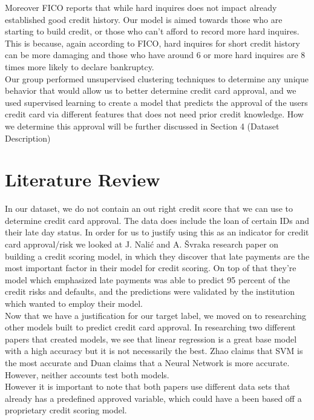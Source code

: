 \documentclass[12pt]{article}
\begin{document}
\noindent Moreover FICO reports that while hard inquires does not impact already established good credit history. Our model is aimed towards those who are starting to build credit, or those who can't afford to record more hard inquires. This is because, again according to FICO, hard inquires for short credit history can be more damaging and those who have around 6 or more hard inquires are 8 times more likely to declare bankruptcy.\\

\noindent Our group performed unsupervised clustering techniques to determine any unique behavior that would allow us to better determine credit card approval, and we used supervised learning to create a model that predicts the approval of the users credit card via different features that does not need prior credit knowledge. How we determine this approval will be further discussed in Section 4 (Dataset Description)

\section{Literature Review}

\noindent In our dataset, we do not contain an out right credit score that we can use to determine credit card approval. The data does include the loan of certain IDs and their late day status. In order for us to justify using this as an indicator for credit card approval/risk we looked at J. Nalić and A. Švraka research paper on building a credit scoring model, in which they discover that late payments are the most important factor in their model for credit scoring. On top of that they're model which emphasized late payments was able to predict 95 percent of the credit risks and defaults, and the predictions were validated by the institution which wanted to employ their model.\\

\noindent Now that we have a justification for our target label, we moved on to researching other models built to predict credit card approval. In researching two different papers that created models, we see that linear regression is a great base model with a high accuracy but it is not necessarily the best. Zhao claims that SVM is the most accurate and Duan claims that a Neural Network is more accurate. However, neither accounts test both models.\\

\noindent However it is important to note that both papers use different data sets that already has a predefined approved variable, which could have a been based off a proprietary credit scoring model.\\
\end{document}
